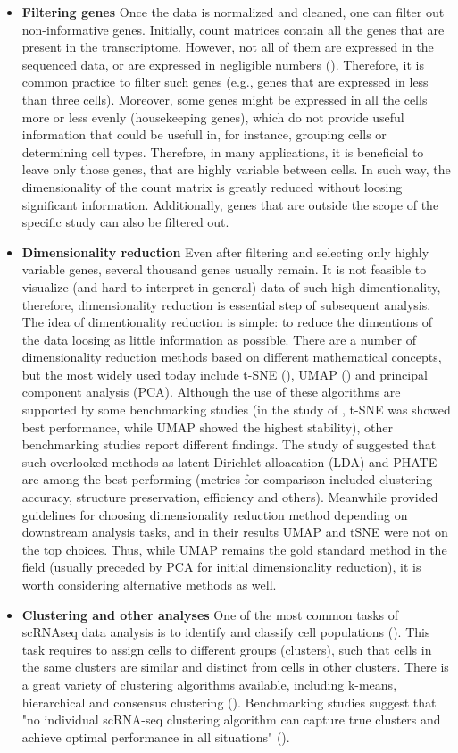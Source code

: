 \begin{itemize}
\item \textbf{Filtering genes}
Once the data is normalized and cleaned, one can filter out non-informative genes.
Initially, count matrices contain all the genes that are present in the transcriptome.
However, not all of them are expressed in the sequenced data, or are expressed in negligible numbers (\cite{Heumos2023}).
Therefore, it is common practice to filter such genes (e.g., genes that are expressed in less than three cells).
Moreover, some genes might be expressed in all the cells more or less evenly (housekeeping genes),
which do not provide useful information that could be usefull in, for instance, grouping cells or determining cell types.
Therefore, in many applications, it is beneficial to leave only those genes, that are highly variable between cells.
In such way, the dimensionality of the count matrix is greatly reduced without loosing significant information.
Additionally, genes that are outside the scope of the specific study can also be filtered out.
\item \textbf{Dimensionality reduction}
Even after filtering and selecting only highly variable genes, several thousand genes usually remain.
It is not feasible to visualize (and hard to interpret in general) data of such high dimentionality, therefore,
dimensionality reduction is essential step of subsequent analysis.
The idea of dimentionality reduction is simple:
to reduce the dimentions of the data loosing as little information as possible.
There are a number of dimensionality reduction methods based on different mathematical concepts,
but the most widely used today include
t-SNE (\cite{Hinton2002}), UMAP (\cite{McInnes2018}) and principal component analysis (PCA).
Although the use of these algorithms are supported by some benchmarking studies
(in the study of \textcite{Xiang2021}, t-SNE was showed best performance, while UMAP showed the highest stability),
other benchmarking studies report different findings.
The study of \textcite{Koch2021} suggested that such overlooked methods as
latent Dirichlet alloacation (LDA) and PHATE are among the best performing
(metrics for comparison included clustering accuracy, structure preservation, efficiency and others).
Meanwhile \textcite{Sun2019} provided guidelines for choosing dimensionality reduction method
depending on downstream analysis tasks, and in their results UMAP and tSNE were not on the top choices.
Thus, while UMAP remains the gold standard method in the field (usually preceded by PCA for initial dimensionality reduction),
it is worth considering alternative methods as well.
\item \textbf{Clustering and other analyses}
One of the most common tasks of scRNAseq data analysis is to identify and classify cell populations (\cite{Andrews2018}).
This task requires to assign cells to different groups (clusters),
such that cells in the same clusters are similar and distinct from cells in other clusters.
There is a great variety of clustering algorithms available,
including k-means, hierarchical and consensus clustering (\cite{Peng2020}).
Benchmarking studies suggest that "no individual scRNA-seq clustering algorithm can capture true clusters and achieve
optimal performance in all situations" (\cite{Peng2020}).


\end{itemize}
